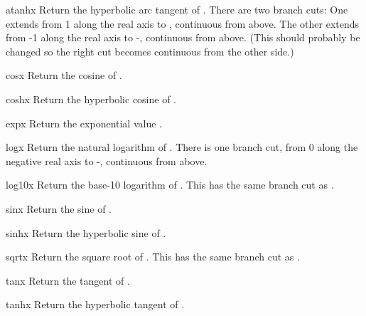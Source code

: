 \begin{funcdesc}{atanh}{x}
Return the hyperbolic arc tangent of .
There are two branch cuts:
One extends from 1 along the real axis to \infinity, continuous
from above.
The other extends from -1 along the real axis to -\infinity,
continuous from above.
(This should probably be changed so the right cut becomes continuous from
the other side.)
\end{funcdesc}

\begin{funcdesc}{cos}{x}
Return the cosine of .
\end{funcdesc}

\begin{funcdesc}{cosh}{x}
Return the hyperbolic cosine of .
\end{funcdesc}

\begin{funcdesc}{exp}{x}
Return the exponential value .
\end{funcdesc}

\begin{funcdesc}{log}{x}
Return the natural logarithm of .
There is one branch cut, from 0 along the negative real axis to
-\infinity, continuous from above.
\end{funcdesc}

\begin{funcdesc}{log10}{x}
Return the base-10 logarithm of .
This has the same branch cut as .
\end{funcdesc}

\begin{funcdesc}{sin}{x}
Return the sine of .
\end{funcdesc}

\begin{funcdesc}{sinh}{x}
Return the hyperbolic sine of .
\end{funcdesc}

\begin{funcdesc}{sqrt}{x}
Return the square root of .
This has the same branch cut as .
\end{funcdesc}

\begin{funcdesc}{tan}{x}
Return the tangent of .
\end{funcdesc}

\begin{funcdesc}{tanh}{x}
Return the hyperbolic tangent of .
\end{funcdesc}

